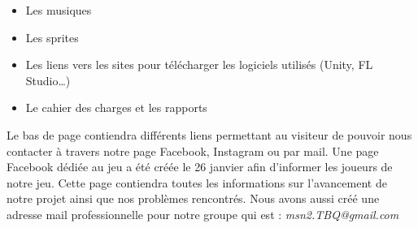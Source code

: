 \documentclass[]{extarticle}
\begin{document}
\begin{spacing}{1.25}
\begin{itemize}
\item Les musiques
\item Les sprites
\item Les liens vers les sites pour télécharger les logiciels utilisés (Unity, FL Studio…)
\item Le cahier des charges et les rapports
\end {itemize}
\bigbreak
\bigbreak
Le bas de page contiendra différents liens permettant au visiteur de pouvoir nous contacter à travers notre page Facebook, Instagram ou par mail.
\bigbreak
\bigbreak
\bigbreak
Une page Facebook dédiée au jeu a été créée le 26 janvier afin d'informer les joueurs de notre jeu. Cette page contiendra toutes les informations sur l'avancement de notre projet ainsi que nos problèmes rencontrés. 
\bigbreak
Nous avons aussi créé une adresse mail professionnelle pour notre groupe qui est : \textit{msn2.TBQ@gmail.com}
\bigbreak
\bigbreak
\bigbreak
\bigbreak
\bigbreak
\bigbreak
\bigbreak


\end{spacing}
\end{document}
